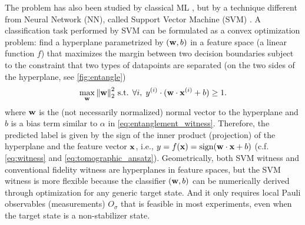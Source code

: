 \documentclass[
aps,
pra,
twocolumn,
floatfix,
]{revtex4-2}
\theoremstyle{plain}
\theoremstyle{definition}
\newcommand{\ew}{W}
\newcommand{\pob}{O}
\newcommand{\dm}{\rho}
\begin{document}
The  problem has also been studied by classical ML \cite{zhuMachineLearningDerivedEntanglement2021}  \cite{vintskevichClassificationFourqubitEntangled2022}, 
but by a technique different from Neural Network (NN), called Support Vector Machine (SVM)  \cite{cortesSupportvectorNetworks1995}.
A classification task performed by SVM can be formulated as a convex optimization problem:
find a hyperplane parametrized by $(\vb{w},b)$  in a feature space (a linear function $f$) that maximizes the margin between two decision boundaries subject to the constraint that two types of datapoints are separated (on the two sides of the hyperplane, see \cref{fig:entangle})
\begin{equation}
	\max_{\vb{w}}
	\norm{\vb{w}}_2^2
	\text{ s.t. }
	\forall i,\; y^{(i)}\cdot (\vb{w}\cdot\vb{x}^{(i)}+b)\ge 1.
	\label{eq:svm_opt}
\end{equation}
where $\vb{w}$ is the (not necessarily normalized) normal vector to the hyperplane and $b$ is a bias term similar to $\alpha$ in \cref{eq:entanglement_witness}.
Therefore, the predicted label is given by the sign of the inner product (projection) of the hyperplane and the feature vector $\vb{x}$, i.e., $y=f(\vb{x})=\text{sign}(\vb{w}\cdot\vb{x}+b)$ (c.f. \cref{eq:witness} and \cref{eq:tomographic_ansatz}).
Geometrically, both SVM witness and conventional fidelity witness
are hyperplanes in feature spaces,
but the SVM witness is more flexible because the classifier $(\vb{w},b)$ can be numerically derived through optimization for any generic target state.
And it only requires local Pauli observables (measurements) $\pob_{\sigma}$ that is feasible in most experiments, even when the target state is a non-stabilizer state.
\end{document}
